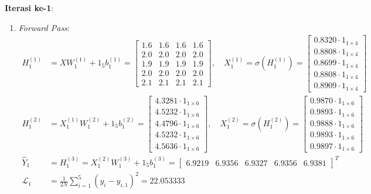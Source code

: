 \documentclass[11pt,a4paper]{article}
\def\mathbf#1{#1}%
\theoremstyle{plain}
\theoremstyle{definition}
\theoremstyle{remark}
\begin{document}
\noindent \textbf{Iterasi ke-1}:
\begin{enumerate}
    \item \textit{Forward Pass}:
    \begin{align}
        H^{(1)}_1 &= X W^{(1)}_1 + \mathbf{1}_5 \mathbf{b}^{(1)}_1 = \begin{bmatrix}
            1.6 & 1.6 & 1.6 & 1.6 \\ 2.0 & 2.0 & 2.0 & 2.0 \\ 1.9 & 1.9 & 1.9 & 1.9 \\ 2.0 & 2.0 & 2.0 & 2.0 \\ 2.1 & 2.1 & 2.1 & 2.1
        \end{bmatrix}, \quad
        X^{(1)}_1 = \sigma\!\left( H^{(1)}_1 \right) = \begin{bmatrix}
            0.8320 \cdot \mathbf{1}_{1 \times 4} \\ 0.8808 \cdot \mathbf{1}_{1 \times 4} \\ 0.8699 \cdot \mathbf{1}_{1 \times 4} \\ 0.8808 \cdot \mathbf{1}_{1 \times 4} \\ 0.8909 \cdot \mathbf{1}_{1 \times 4}
        \end{bmatrix} \\[0.2em]
        H^{(2)}_1 &= X^{(1)}_1 W^{(2)}_1 + \mathbf{1}_5 \mathbf{b}^{(2)}_1 = \begin{bmatrix} 4.3281 \cdot \mathbf{1}_{1 \times 6} \\ 4.5232 \cdot \mathbf{1}_{1 \times 6} \\ 4.4796 \cdot \mathbf{1}_{1 \times 6} \\ 4.5232 \cdot \mathbf{1}_{1 \times 6} \\ 4.5636 \cdot \mathbf{1}_{1 \times 6} \end{bmatrix}, \quad
        X^{(2)}_1 = \sigma\!\left( H^{(2)}_1 \right) = \begin{bmatrix} 0.9870 \cdot \mathbf{1}_{1 \times 6} \\ 0.9893 \cdot \mathbf{1}_{1 \times 6} \\ 0.9888 \cdot \mathbf{1}_{1 \times 6} \\ 0.9893 \cdot \mathbf{1}_{1 \times 6} \\ 0.9897 \cdot \mathbf{1}_{1 \times 6} \end{bmatrix} \\[0.2em]
        \hat{Y}_1 &= H^{(3)}_1 = X^{(2)}_1 W^{(3)}_1 + \mathbf{1}_5 \mathbf{b}^{(3)}_1 = \begin{bmatrix} 6.9219 & 6.9356 & 6.9327 & 6.9356 & 6.9381 \end{bmatrix}^T \\[0.2em]
        \mathcal{L}_1 &= \frac{1}{2N} \sum_{i=1}^5 \left( y_i - \hat{y}_{i, 1} \right)^2 = 22.053333
    \end{align}


\end{enumerate}
\end{document}
